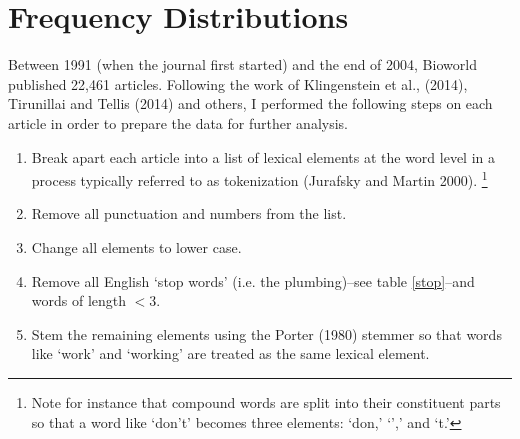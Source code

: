 \section{Frequency Distributions}

Between 1991 (when the journal first started) and the end of 2004, Bioworld published 22,461 articles. Following the work of Klingenstein et al., (2014), Tirunillai and Tellis (2014) and others, I performed the following steps on each article in order to prepare the data for further analysis.
\begin{enumerate}
  \item Break apart each article into a list of lexical elements at the word level in a process typically referred to as tokenization (Jurafsky and Martin 2000). \footnote{Note for instance that compound words are split into their constituent parts so that a word like `don't' becomes three elements: `don,' `',' and `t.'}
  \item Remove all punctuation and numbers from the list.
  \item Change all elements to lower case.
  \item Remove all English `stop words' (i.e. the plumbing)--see table \ref{stop}--and words of length $< 3$.
  \item Stem the remaining elements using the Porter (1980) stemmer so that words like `work' and `working' are treated as the same lexical element.
\end{enumerate}

